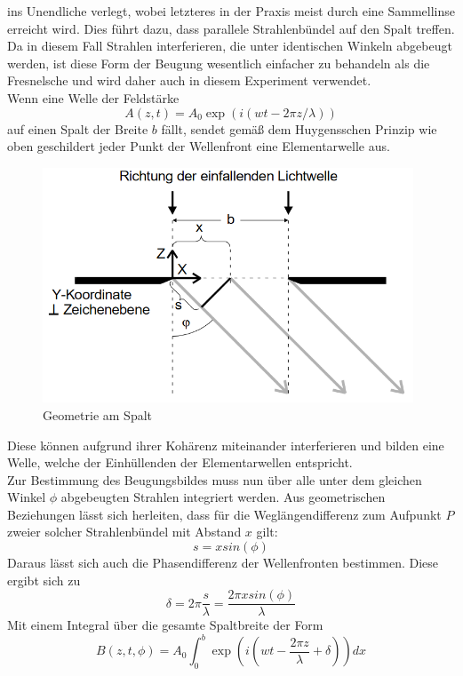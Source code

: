 ins Unendliche verlegt, wobei letzteres in der Praxis meist durch eine Sammellinse erreicht wird. Dies führt dazu, dass parallele Strahlenbündel
auf den Spalt treffen. Da in diesem Fall Strahlen interferieren, die unter identischen Winkeln abgebeugt werden, ist diese Form der Beugung wesentlich 
einfacher zu behandeln als die Fresnelsche und wird daher auch in diesem Experiment verwendet. \\
Wenn eine Welle der Feldstärke
\begin{equation}
A(z,t)=A_0\exp(i(wt-2\pi z/\lambda))
\end{equation}
auf einen Spalt der Breite $b$ fällt, sendet gemäß dem Huygensschen Prinzip wie oben geschildert jeder Punkt der Wellenfront
eine Elementarwelle aus.
\begin{figure} [h]
    \centering
    \includegraphics[height=7cm, keepaspectratio]{Spalt geometrie}
    \caption{Geometrie am Spalt}
 \end{figure}
Diese können aufgrund ihrer Kohärenz miteinander interferieren und bilden eine Welle, welche der Einhüllenden der Elementarwellen 
entspricht. \\ Zur Bestimmung des Beugungsbildes muss nun über alle unter dem gleichen Winkel $\phi$ abgebeugten Strahlen 
integriert werden. Aus geometrischen Beziehungen lässt sich herleiten, dass für die Weglängendifferenz zum Aufpunkt $P$ zweier solcher Strahlenbündel mit Abstand $x$ gilt:
\begin{equation}
s=xsin(\phi)
\end{equation}
Daraus lässt sich auch die Phasendifferenz der Wellenfronten bestimmen. Diese ergibt sich zu
\begin{equation}
\delta=2\pi\frac{s}{\lambda}=\frac{2\pi xsin(\phi)}{\lambda}
\end{equation}
Mit einem Integral über die gesamte Spaltbreite der Form
\begin{equation}
B(z,t,\phi)=A_0 \int_{0}^{b} \exp(i(wt-\frac{2\pi z}{\lambda}+\delta))dx
\end{equation}
